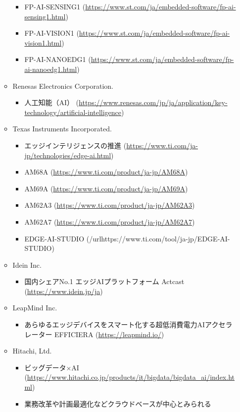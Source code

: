 \begin{itemize}
\begin{itemize}
\begin{itemize}
			\item FP-AI-SENSING1 (\url{https://www.st.com/ja/embedded-software/fp-ai-sensing1.html})
			\item FP-AI-VISION1 (\url{https://www.st.com/ja/embedded-software/fp-ai-vision1.html})
			\item FP-AI-NANOEDG1 (\url{https://www.st.com/ja/embedded-software/fp-ai-nanoedg1.html})
		\end{itemize}
		\item Renesas Electronics Corporation.
		\begin{itemize}
			\item 人工知能（AI） (\url{https://www.renesas.com/jp/ja/application/key-technology/artificial-intelligence})
		\end{itemize}
		\item Texas Instruments Incorporated.
		\begin{itemize}
			\item エッジインテリジェンスの推進 (\url{https://www.ti.com/ja-jp/technologies/edge-ai.html})
			\item AM68A (\url{https://www.ti.com/product/ja-jp/AM68A})
			\item AM69A (\url{https://www.ti.com/product/ja-jp/AM69A})
			\item AM62A3 (\url{https://www.ti.com/product/ja-jp/AM62A3})
			\item AM62A7 (\url{https://www.ti.com/product/ja-jp/AM62A7})
			\item EDGE-AI-STUDIO (/url{https://www.ti.com/tool/ja-jp/EDGE-AI-STUDIO})
		\end{itemize}
		\item Idein Inc.
		\begin{itemize}
			\item 国内シェアNo.1 エッジAIプラットフォーム Actcast (\url{https://www.idein.jp/ja})
		\end{itemize}
		\item LeapMind Inc.
		\begin{itemize}
			\item あらゆるエッジデバイスをスマート化する超低消費電力AIアクセラレーター EFFICIERA (\url{https://leapmind.io/})
		\end{itemize}
		\item Hitachi, Ltd.
		\begin{itemize}
			\item ビッグデータ×AI (\url{https://www.hitachi.co.jp/products/it/bigdata/bigdata_ai/index.html})
			\item 業務改革や計画最適化などクラウドベースが中心とみられる

\end{itemize}
\end{itemize}
\end{itemize}
